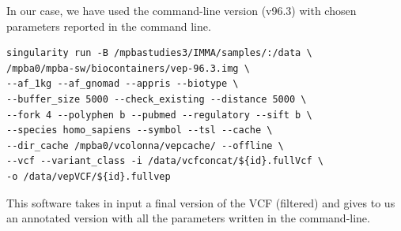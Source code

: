 \documentclass[
tikz,
11pt, %
oneside, %
english, %
singlespacing, %
headsepline, %
]{MastersDoctoralThesisV2} %
\begin{document}
In our case, we have used the command-line version (v96.3) with chosen parameters reported in the command line.

\begin{verbatim}
singularity run -B /mpbastudies3/IMMA/samples/:/data \
/mpba0/mpba-sw/biocontainers/vep-96.3.img \
--af_1kg --af_gnomad --appris --biotype \
--buffer_size 5000 --check_existing --distance 5000 \
--fork 4 --polyphen b --pubmed --regulatory --sift b \
--species homo_sapiens --symbol --tsl --cache \
--dir_cache /mpba0/vcolonna/vepcache/ --offline \
--vcf --variant_class -i /data/vcfconcat/${id}.fullVcf \
-o /data/vepVCF/${id}.fullvep
\end{verbatim}

This software takes in input a final version of the VCF (filtered) and gives to us an annotated version with all the parameters written in the command-line. 

\textbf{}


\printglossary

\printbibliography[heading=bibintoc]


\begin{acknowledgements}
\addchaptertocentry{\acknowledgementname}
\end{acknowledgements}
\end{document}
